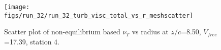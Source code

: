 \begin{figure}[H]
\centering
\texttt{[image: figs/run\_32/run\_32\_turb\_visc\_total\_vs\_r\_meshscatter]}
\caption{Scatter plot of non-equilibrium based $\nu_T$ vs radius at $z/c$=8.50, $V_{free}$=17.39, station 4.}
\label{fig:run_32_turb_visc_total_vs_r_meshscatter}
\end{figure}


